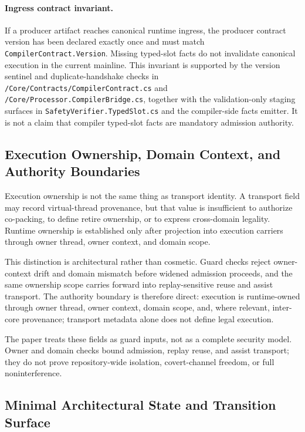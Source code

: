 \documentclass[twocolumn]{article}
\begin{document}
\paragraph{Ingress contract invariant.}
If a producer artifact reaches canonical runtime ingress, the producer contract version has been declared exactly once and must match \texttt{CompilerContract.Version}. Missing typed-slot facts do not invalidate canonical execution in the current mainline. This invariant is supported by the version sentinel and duplicate-handshake checks in \texttt{/Core/Contracts/CompilerContract.cs} and \texttt{/Core/Processor.CompilerBridge.cs}, together with the validation-only staging surfaces in \texttt{SafetyVerifier.TypedSlot.cs} and the compiler-side facts emitter. It is not a claim that compiler typed-slot facts are mandatory admission authority.


\subsection{Execution Ownership, Domain Context, and Authority Boundaries}

Execution ownership is not the same thing as transport identity. A transport field may record virtual-thread provenance, but that value is insufficient to authorize co-packing, to define retire ownership, or to express cross-domain legality. Runtime ownership is established only after projection into execution carriers through owner thread, owner context, and domain scope.

This distinction is architectural rather than cosmetic. Guard checks reject owner-context drift and domain mismatch before widened admission proceeds, and the same ownership scope carries forward into replay-sensitive reuse and assist transport. The authority boundary is therefore direct: execution is runtime-owned through owner thread, owner context, domain scope, and, where relevant, inter-core provenance; transport metadata alone does not define legal execution.

The paper treats these fields as guard inputs, not as a complete security model. Owner and domain checks bound admission, replay reuse, and assist transport; they do not prove repository-wide isolation, covert-channel freedom, or full noninterference.


\subsection{Minimal Architectural State and Transition Surface}
\end{document}
